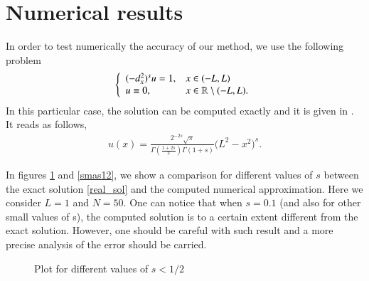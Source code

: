 \section{Numerical results} \label{res_numerical}
%
In order to test numerically the accuracy of our method, we use the following problem 
%
\begin{align*}
	\left\{\begin{array}{ll}
		(-d_x^2)^{s}u = 1, & x\in(-L,L)
		\\
		u\equiv 0, & x\in\mathbb{R}\setminus(-L,L).
	\end{array}\right.
\end{align*}
%
In this particular case, the solution can be computed exactly and it is given in \cite{getoor1961first}. It reads as follows, 
\begin{align}\label{real_sol}
	u(x)=\frac{2^{-2s}\sqrt{\pi}}{\Gamma\left(\frac{1+2s}{2}\right)\Gamma(1+s)}\Big(L^2-x^2\Big)^s.
\end{align}

In figures \ref{smenos12} and \ref{smas12}, we show a comparison for different values of $s$ between the exact solution \eqref{real_sol} and the computed numerical approximation. Here we consider $L=1$ and $N=50$. One can notice that when $s=0.1$ (and also for other small values of s), the computed solution is to a certain extent different from the exact solution. However, one should be careful with such result and a more precise analysis of the error should be carried. 
%
\begin{figure}[!h]
		\hspace{1cm}
	\caption{Plot for different values of $s<1/2$}
	\label{smenos12}
\end{figure}

